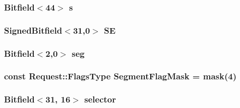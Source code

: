 \label{namespaceX86ISA_a58d754bc1e9db1b928a4aa7bb958abf1}
\hypertarget{namespaceX86ISA_a6005be610d16236f9fbe2983286450d1}{
\subsubsection[{s}]{\setlength{\rightskip}{0pt plus 5cm}Bitfield$<$44$>$ {\bf s}}}
\label{namespaceX86ISA_a6005be610d16236f9fbe2983286450d1}
\hypertarget{namespaceX86ISA_acec6d8ad52a28972fa74e071c1a63b6a}{
\subsubsection[{scale}]{}}
\label{namespaceX86ISA_acec6d8ad52a28972fa74e071c1a63b6a}
\hypertarget{namespaceX86ISA_abbbf2eaf763539e94e31a3f4a250c99a}{
\subsubsection[{SE}]{\setlength{\rightskip}{0pt plus 5cm}SignedBitfield$<$31,0$>$ {\bf SE}}}
\label{namespaceX86ISA_abbbf2eaf763539e94e31a3f4a250c99a}
\hypertarget{namespaceX86ISA_a93006a29bcdfcda7fdda27c7deec6618}{
\subsubsection[{seg}]{\setlength{\rightskip}{0pt plus 5cm}Bitfield$<$2,0$>$ {\bf seg}}}
\label{namespaceX86ISA_a93006a29bcdfcda7fdda27c7deec6618}
\hypertarget{namespaceX86ISA_a77dc1966203d85366152637f9b44877f}{
\subsubsection[{SegmentFlagMask}]{\setlength{\rightskip}{0pt plus 5cm}const {\bf Request::FlagsType} {\bf SegmentFlagMask} = {\bf mask}(4)}}
\label{namespaceX86ISA_a77dc1966203d85366152637f9b44877f}
\hypertarget{namespaceX86ISA_a94c9f56283a29c6a5dcd42d7c0d18dec}{
\subsubsection[{selector}]{\setlength{\rightskip}{0pt plus 5cm}Bitfield$<$31, 16$>$ {\bf selector}}}
